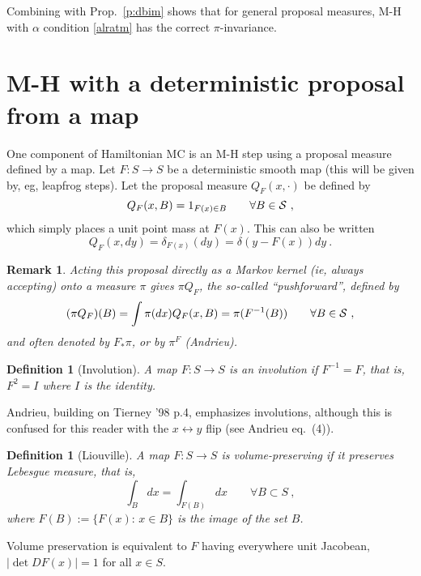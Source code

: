 \documentclass[10pt]{article}
\newtheorem{rmk}[thm]{Remark}
\newtheorem{dfn}[thm]{Definition}
\newcommand{\al}{\alpha}
\begin{document}
Combining with Prop.~\ref{p:dbim} shows that for general proposal measures,
M-H with $\al$ condition \eqref{alratm} has the correct $\pi$-invariance.



\section{M-H with a deterministic proposal from a map}

One component of Hamiltonian MC is an M-H step using a proposal measure defined by a map.
Let $F: S\to S$ be a deterministic smooth map (this will be given by, eg,
leapfrog steps).
Let the proposal measure $Q_F(x,\cdot)$ be defined by
$$
Q_F(x,B) = 1_{F(x)\in B} \qquad \forall B \in \cal S~,
$$
which simply places a unit point mass at $F(x)$.
This can also be written
$$
Q_F(x,dy) = \delta_{F(x)}(dy) = \delta(y - F(x)) dy ~.
$$
\begin{rmk} Acting this proposal directly as a Markov kernel (ie, always accepting) onto a measure $\pi$ gives $\pi Q_F$, the so-called ``pushforward'',
  defined by
$$
(\pi Q_F)(B) = \int \pi(dx) Q_F(x,B) = \pi(F^{-1}(B)) \qquad \forall B \in \cal S~,
$$
and often denoted by $F_\ast \pi$, or by $\pi^F$ (Andrieu).
\end{rmk}

\begin{dfn}[Involution]
  A map $F:S\to S$ is an involution if $F^{-1} = F$,
  that is, $F^2=I$ where $I$ is the identity.
\end{dfn}
Andrieu, building on Tierney '98 p.4, emphasizes involutions,
although this is confused for this reader with the $x\leftrightarrow y$ flip
(see Andrieu eq.~(4)).

\begin{dfn}[Liouville]
  A map $F:S\to S$ is volume-preserving if it preserves Lebesgue measure,
  that is,
  $$
  \int_B dx = \int_{F(B)} dx \qquad \forall B \subset S~,
  $$
  where $F(B):=\{F(x): \, x\in B\}$ is the image of the set $B$.
\end{dfn}
Volume preservation is equivalent to $F$ having everywhere unit Jacobean,
$|\det DF(x)| = 1$ for all $x\in S$.
\end{document}
